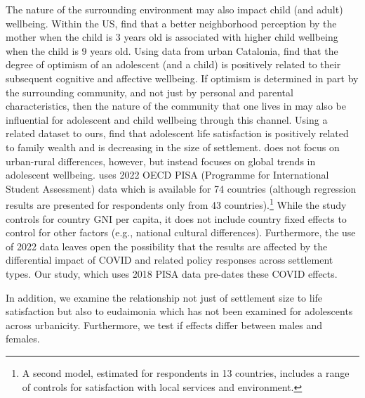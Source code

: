 \documentclass[11pt, letterpaper]{article}
\begin{document}
\begin{spacing}{1.9}
The nature of the surrounding environment may also impact child (and adult) wellbeing. Within the US, \citet{fava2022} find that a better neighborhood perception by the mother when the child is 3 years old is associated with higher child wellbeing when the child is 9 years old. Using data from urban Catalonia, \citet{oriol2023} find that the degree of optimism of an adolescent (and a child) is positively related to their subsequent cognitive and affective wellbeing. If optimism is determined in part by the surrounding community, and not just by personal and parental characteristics, then the nature of the community that one lives in may also be influential for adolescent and child wellbeing through this channel. 
Using a related dataset to ours, \citet{marquez24} find that adolescent life satisfaction is positively
related to family wealth and is decreasing in the size of
settlement. \citet{marquez24} does not focus on urban-rural differences,
however, but instead focuses on global trends in adolescent wellbeing.  
 \citet{marquez24} uses 2022 OECD PISA (Programme for
International Student Assessment) data which is available for 74 countries (although regression results are
presented for respondents only from 43 countries).\footnote{A second model, estimated for respondents in 13 countries, includes a range of controls
  for satisfaction with local services and environment.}
While the study controls for country GNI per capita, it does
not include country fixed effects to control for other factors (e.g., national cultural differences). Furthermore,
the use of 2022 data leaves open the possibility that the results are affected by the differential impact of COVID
and related policy responses across settlement types.
Our study, which uses 2018 PISA data pre-dates these COVID effects.

In addition,
we examine the relationship not just of settlement size to life satisfaction but
also to eudaimonia which has not been examined for adolescents across
urbanicity. Furthermore, we test if effects differ between males and
females. %


\end{spacing}
\end{document}
